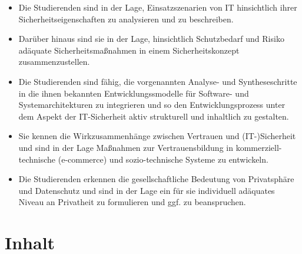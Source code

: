 \begin{itemize}
\tightlist
\item
  Die Studierenden sind in der Lage, Einsatzszenarien von IT
  hinsichtlich ihrer Sicherheitseigenschaften zu analysieren und zu
  beschreiben.
\item
  Darüber hinaus sind sie in der Lage, hinsichtlich Schutzbedarf und
  Risiko adäquate Sicherheitsmaßnahmen in einem Sicherheitskonzept
  zusammenzustellen.
\item
  Die Studierenden sind fähig, die vorgenannten Analyse- und
  Syntheseschritte in die ihnen bekannten Entwicklungssmodelle für
  Software- und Systemarchitekturen zu integrieren und so den
  Entwicklungsprozess unter dem Aspekt der IT-Sicherheit aktiv
  strukturell und inhaltlich zu gestalten.
\item
  Sie kennen die Wirkzusammenhänge zwischen Vertrauen und
  (IT-)Sicherheit und sind in der Lage Maßnahmen zur Vertrauensbildung
  in kommerziell-technische (e-commerce) und sozio-technische Systeme zu
  entwickeln.
\item
  Die Studierenden erkennen die gesellschaftliche Bedeutung von
  Privatsphäre und Datenschutz und sind in der Lage ein für sie
  individuell adäquates Niveau an Privatheit zu formulieren und ggf. zu
  beanspruchen.
\end{itemize}

\section*{Inhalt\label{/mi-2017/modulbeschreibungen-master/MA_WTW_Modul_IT-Sicherheit}}\label{inhaltpathlabelmi-2017modulbeschreibungen-mastermaux5fwtwux5fmodulux5fit-sicherheit}

